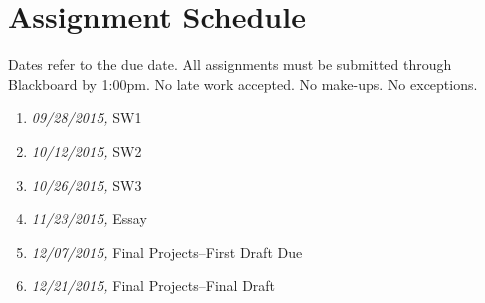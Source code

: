 \documentclass[article,oneside]{memoir}
\begin{document}
\section{ Assignment Schedule}
Dates refer to the due date. All assignments must be submitted through Blackboard by 1:00pm. No late work accepted. No make-ups. No exceptions. 

\begin{enumerate}
\item \textit{09/28/2015,} SW1
\item \textit{10/12/2015,} SW2
\item \textit{10/26/2015,} SW3
\item \textit{11/23/2015,} Essay 
\item \textit{12/07/2015,} Final Projects--First Draft Due
\item \textit{12/21/2015,} Final Projects--Final Draft
\end{enumerate}




\end{document}
